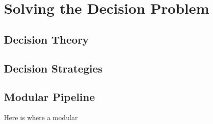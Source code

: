 \section{Solving the Decision Problem}
\subsection{Decision Theory}

\subsection{Decision Strategies}

\subsection{Modular Pipeline}
Here is where a modular 

